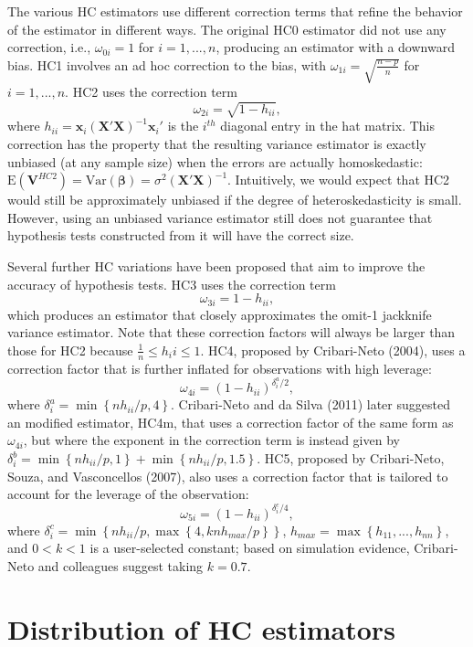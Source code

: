 \documentclass{article}\usepackage[]{graphicx}\usepackage[]{color}
\newcommand{\E}{\text{E}}
\newcommand{\Var}{\text{Var}}
\newcommand{\bm}{\mathbf}
\newcommand{\bs}{\boldsymbol}
\begin{document}
The various HC estimators use different correction terms that refine the behavior of the estimator in different ways. The original HC0 estimator did not use any correction, i.e., $\omega_{0i} = 1$ for $i = 1,...,n$, producing an estimator with a downward bias. HC1 involves an ad hoc correction to the bias, with $\omega_{1i} = \sqrt{\frac{n - p}{n}}$ for $i = 1,...,n$. HC2 uses the correction term \[
\omega_{2i} = \sqrt{1 - h_{ii}}, \]
where $h_{ii} = \bm{x}_i \left(\bm{X}'\bm{X}\right)^{-1} \bm{x}_i'$ is the $i^{th}$ diagonal entry in the hat matrix. This correction has the property that the resulting variance estimator is exactly unbiased (at any sample size) when the errors are actually homoskedastic: $\E\left(\bm{V}^{HC2}\right) = \Var\left(\bs\beta\right) = \sigma^2\left(\bm{X}'\bm{X}\right)^{-1}$. Intuitively, we would expect that HC2 would still be approximately unbiased if the degree of heteroskedasticity is small. However, using an unbiased variance estimator still does not guarantee that hypothesis tests constructed from it will have the correct size. 

Several further HC variations have been proposed that aim to improve the accuracy of hypothesis tests. HC3 uses the correction term \[
\omega_{3i} = 1 - h_{ii}, \]
which produces an estimator that closely approximates the omit-1 jackknife variance estimator. Note that these correction factors will always be larger than those for HC2 because $\frac{1}{n} \leq h_ii \leq 1$. HC4, proposed by Cribari-Neto (2004), uses a correction factor that is further inflated for observations with high leverage: \[
\omega_{4i} = (1 - h_{ii})^{\delta^a_i / 2}, \]
where $\delta^a_i = \min\left\{n h_{ii} / p, 4 \right\}$. Cribari-Neto and da Silva (2011) later suggested an modified estimator, HC4m, that uses a correction factor of the same form as $\omega_{4i}$, but where the exponent in the correction term is instead given by $\delta^b_i = \min\left\{n h_{ii} / p, 1 \right\} + \min\left\{n h_{ii} / p, 1.5 \right\}$. HC5, proposed by Cribari-Neto, Souza, and Vasconcellos (2007), also uses a correction factor that is tailored to account for the leverage of the observation: \[
\omega_{5i} = (1 - h_{ii})^{\delta^c_i / 4}, \]
where $\delta^c_i = \min\left\{n h_{ii} / p, \max \left\{4, k n h_{max} / p\right\}\right\}$, $h_{max} = \max\left\{h_{11},...,h_{nn}\right\}$, and $0 < k < 1$ is a user-selected constant; based on simulation evidence, Cribari-Neto and colleagues suggest taking $k = 0.7$.

\section{Distribution of HC estimators}
\end{document}
